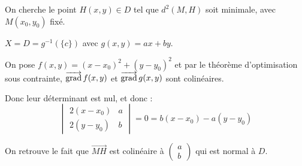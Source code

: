 \begin{exemple}
    


\begin{center}


\end{center}

On cherche le point $H(x, y) \in D$ tel que $ d^2(M, H) $ soit minimale, avec $M(x_0, y_0)$ fixé.

$X = D = g^{-1}(\{c\})$ avec $g(x, y) = ax + by$.

On pose $f(x, y) = (x - x_0)^2 + (y - y_0)^2$ et par le théorème d'optimisation sous contrainte,
$\overrightarrow{\operatorname{grad}} \, f (x, y)$ et $\overrightarrow{\operatorname{grad}} \, g(x, y)$ sont colinéaires.

Donc leur déterminant est nul, et donc : 
$$\begin{vmatrix}
    2(x - x_0) & a \\
    2(y - y_0) & b
\end{vmatrix} = 0 = b(x - x_0) - a (y - y_0)$$

On retrouve le fait que $\overrightarrow{MH}$ est colinéaire à $\begin{pmatrix}
    a \\
    b
\end{pmatrix}$ qui est normal à $D$.
\end{exemple}

